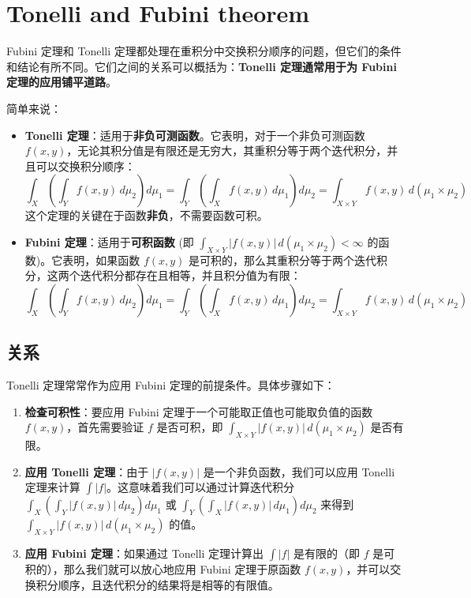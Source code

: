\section{Tonelli and Fubini theorem}

Fubini 定理和 Tonelli 定理都处理在重积分中交换积分顺序的问题，但它们的条件和结论有所不同。它们之间的关系可以概括为：\textbf{Tonelli 定理通常用于为 Fubini 定理的应用铺平道路}。

简单来说：

\begin{itemize}
	\item \textbf{Tonelli 定理}：适用于\textbf{非负可测函数}。它表明，对于一个非负可测函数 $f(x,y)$，无论其积分值是有限还是无穷大，其重积分等于两个迭代积分，并且可以交换积分顺序：
\[
\int_X \left( \int_Y f(x,y) \, d\mu_2 \right) d\mu_1 = \int_Y \left( \int_X f(x,y) \, d\mu_1 \right) d\mu_2 = \int_{X \times Y} f(x,y) \, d(\mu_1 \times \mu_2)
\]这个定理的关键在于函数\textbf{非负}，不需要函数可积。
	\item \textbf{Fubini 定理}：适用于\textbf{可积函数} (即 $\int_{X \times Y} |f(x,y)| \, d(\mu_1 \times \mu_2) < \infty$ 的函数)。它表明，如果函数 $f(x,y)$ 是可积的，那么其重积分等于两个迭代积分，这两个迭代积分都存在且相等，并且积分值为有限：
\[
\int_X \left( \int_Y f(x,y) \, d\mu_2 \right) d\mu_1 = \int_Y \left( \int_X f(x,y) \, d\mu_1 \right) d\mu_2 = \int_{X \times Y} f(x,y) \, d(\mu_1 \times \mu_2)
\]\end{itemize}

\subsection{关系 🤝}

Tonelli 定理常常作为应用 Fubini 定理的前提条件。具体步骤如下：

\begin{enumerate}
	\item \textbf{检查可积性}：要应用 Fubini 定理于一个可能取正值也可能取负值的函数 $f(x,y)$，首先需要验证 $f$ 是否可积，即 $\int_{X \times Y} |f(x,y)| \, d(\mu_1 \times \mu_2)$ 是否有限。
	\item \textbf{应用 Tonelli 定理}：由于 $|f(x,y)|$ 是一个非负函数，我们可以应用 Tonelli 定理来计算 $\int |f|$。这意味着我们可以通过计算迭代积分 $\int_X (\int_Y |f(x,y)| \, d\mu_2) d\mu_1$ 或 $\int_Y (\int_X |f(x,y)| \, d\mu_1) d\mu_2$ 来得到 $\int_{X \times Y} |f(x,y)| \, d(\mu_1 \times \mu_2)$ 的值。
	\item \textbf{应用 Fubini 定理}：如果通过 Tonelli 定理计算出 $\int |f|$ 是有限的（即 $f$ 是可积的），那么我们就可以放心地应用 Fubini 定理于原函数 $f(x,y)$，并可以交换积分顺序，且迭代积分的结果将是相等的有限值。
\end{enumerate}

